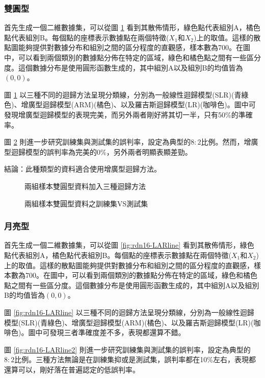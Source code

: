 \documentclass[12pt, a4paper]{article}
\begin{document}
\subsubsection{雙圓型}
首先生成一個二維數據集，可以從圖 \ref{fig:rdn15-LARline} 看到其散佈情形，綠色點代表組別A，橘色點代表組別B。每個點的座標表示數據點在兩個特徵($X_1$和$X_2$)上的取值。這樣的散點圖能夠提供對數據分布和組別之間的區分程度的直觀感，樣本數為700。在圖中，可以看到兩個類別的數據點分佈在特定的區域，綠色和橘色點之間有一些區分度。這個數據分布是使用圓形函數生成的，其中組別A以及組別B的均值皆為$(0,0)$。

圖 \ref{fig:rdn15-LARline} 以三種不同的迴歸方法呈現分類線，分別為一般線性迴歸模型(SLR)(青綠色)、增廣型迴歸模型(ARM)(橘色)、以及羅吉斯迴歸模型(LR)(咖啡色)。圖中可發現增廣型迴歸模型的表現完美，而另外兩者剛好將其切一半，只有50\%的準確率。

圖 \ref{fig:rdn15-LARline2} 則進一步研究訓練集與測試集的誤判率，設定為典型的$8:2$比例。然而，增廣型迴歸模型的誤判率為完美的0\%，另外兩者明顯表顯差勁。

結論：此種類型的資料適合使用增廣型迴歸方法。
\begin{figure}[H]
    \caption{兩組樣本雙圓型資料加入三種迴歸方法}
    \label{fig:rdn15-LARline}
\end{figure}
\begin{figure}[H]
    \caption{兩組樣本雙圓型資料之訓練集VS測試集}
    \label{fig:rdn15-LARline2}
\end{figure}
\subsubsection{月亮型}
首先生成一個二維數據集，可以從圖 \ref{fig:rdn16-LARline} 看到其散佈情形，綠色點代表組別A，橘色點代表組別B。每個點的座標表示數據點在兩個特徵($X_1$和$X_2$)上的取值。這樣的散點圖能夠提供對數據分布和組別之間的區分程度的直觀感，樣本數為700。在圖中，可以看到兩個類別的數據點分佈在特定的區域，綠色和橘色點之間有一些區分度。這個數據分布是使用圓形函數生成的，其中組別A以及組別B的均值皆為$(0,0)$。

圖 \ref{fig:rdn16-LARline} 以三種不同的迴歸方法呈現分類線，分別為一般線性迴歸模型(SLR)(青綠色)、增廣型迴歸模型(ARM)(橘色)、以及羅吉斯迴歸模型(LR)(咖啡色)。圖中可發現三者準確度差不多，表現都還算不錯。

圖 \ref{fig:rdn16-LARline2} 則進一步研究訓練集與測試集的誤判率，設定為典型的$8:2$比例。三種方法無論是在訓練集抑或是測試集，誤判率都在10\%左右，表現都還算可以，剛好落在普遍認定的低誤判率。
\end{document}
